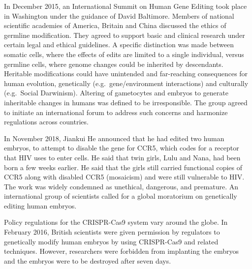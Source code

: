 In December 2015, an International Summit on Human Gene Editing took place in Washington under the guidance of David Baltimore. Members of national scientific academies of America, Britain and China discussed the ethics of germline modification. They agreed to support basic and clinical research under certain legal and ethical guidelines. A specific distinction was made between somatic cells, where the effects of edits are limited to a single individual, versus germline cells, where genome changes could be inherited by descendants. Heritable modifications could have unintended and far-reaching consequences for human evolution, genetically (e.g.~gene/environment interactions) and culturally (e.g.~Social Darwinism). Altering of gametocytes and embryos to generate inheritable changes in humans was defined to be irresponsible. The group agreed to initiate an international forum to address such concerns and harmonize regulations across countries.

In November 2018, Jiankui He announced that he had edited two human embryos, to attempt to disable the gene for CCR5, which codes for a receptor that HIV uses to enter cells. He said that twin girls, Lulu and Nana, had been born a few weeks earlier. He said that the girls still carried functional copies of CCR5 along with disabled CCR5 (mosaicism) and were still vulnerable to HIV. The work was widely condemned as unethical, dangerous, and premature. An international group of scientists called for a global moratorium on genetically editing human embryos.

Policy regulations for the CRISPR-Cas9 system vary around the globe. In February 2016, British scientists were given permission by regulators to genetically modify human embryos by using CRISPR-Cas9 and related techniques. However, researchers were forbidden from implanting the embryos and the embryos were to be destroyed after seven days.

